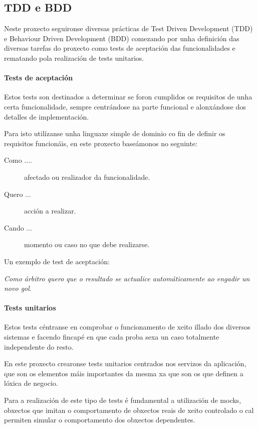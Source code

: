    \subsection{TDD e BDD}
  Neste proxecto seguironse diversas prácticas de Test Driven Development 
(TDD) e Behaviour Driven Development (BDD) comezando por unha definición das 
diversas tarefas do proxecto como tests de aceptación das funcionalidades e 
rematando pola realización de tests unitarios.

      \paragraph{Tests de aceptación} Estos tests son destinados a determinar 
se foron cumplidos os requisitos de unha certa funcionalidade, sempre 
centrándose na parte funcional e alonxándose dos detalles de implementación.

      Para isto utilízanse unha linguaxe simple de dominio co fin de definir os 
requisitos funcionáis, en este proxecto baseámonos no seguinte:

        \begin{description}
         \item [Como ....] afectado ou realizador da funcionalidade.
         \item [Quero ...] acción a realizar.
         \item [Cando ...] momento ou caso no que debe realizarse.
        \end{description}

        Un exemplo de test de aceptación:

        \emph{Como árbitro quero que o resultado se actualice automáticamente 
ao engadir un novo gol}.

      \paragraph{Tests unitarios} Estos tests céntranse en comprobar o 
funcionamento de xeito illado dos diversos sistemas e facendo fincapé en que 
cada proba sexa un caso totalmente independente do resto.

      En este proxecto crearonse tests unitarios centrados nos servizos da 
aplicación, que son os elementos máis importantes da mesma xa que son os que 
definen a lóxica de negocio.

      Para a realización de este tipo de tests é fundamental a utilización de 
mocks, obxectos que imitan o comportamento de obxectos reais de xeito 
controlado o cal permiten simular o comportamento dos obxectos dependentes.

